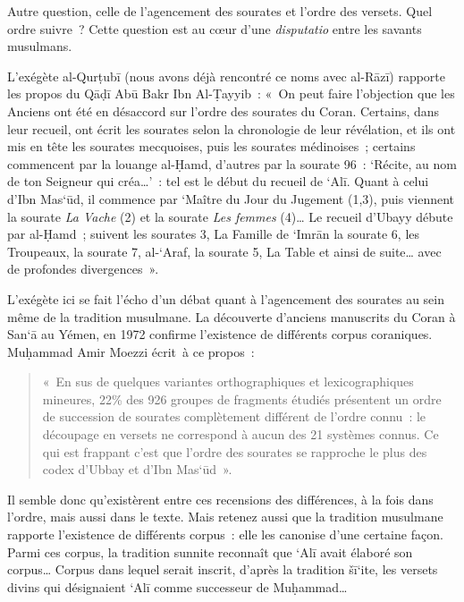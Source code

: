 
Autre question, celle de l'agencement des sourates et l'ordre des
versets. Quel ordre suivre~? Cette question est au cœur d'une
\emph{disputatio} entre les savants musulmans.

L'exégète al-Qurṭubī (nous avons déjà rencontré ce noms avec al-Rāzī)
rapporte les propos du Qāḍī Abū Bakr Ibn Al-Ṭayyib~: «~On peut faire
l'objection que les Anciens ont été en désaccord sur l'ordre des
sourates du Coran. Certains, dans leur recueil, ont écrit les sourates
selon la chronologie de leur révélation, et ils ont mis en tête les
sourates mecquoises, puis les sourates médinoises~; certains commencent
par la louange al-Ḥamd, d'autres par la sourate 96~: `Récite, au nom de
ton Seigneur qui créa\ldots'~: tel est le début du recueil de `Alī.
Quant à celui d'Ibn Mas`ūd, il commence par `Maître du Jour du Jugement
(1,3), puis viennent la sourate \emph{La Vache} (2) et la sourate
\emph{Les femmes} (4)\ldots{} Le recueil d'Ubayy débute par al-Ḥamd~;
suivent les sourates 3, La Famille de `Imrān la sourate 6, les
Troupeaux, la sourate 7, al-`Araf, la sourate 5, La Table et ainsi de
suite\ldots{} avec de profondes divergences~».

L'exégète ici se fait l'écho d'un débat quant à l'agencement des
sourates au sein même de la tradition musulmane. La découverte d'anciens
manuscrits du Coran à San`ā au Yémen, en 1972 confirme l'existence de
différents corpus coraniques. Muḥammad Amir Moezzi écrit~à ce propos~:
\begin{quote}
    «~En sus de quelques variantes orthographiques et lexicographiques
mineures, 22\% des 926 groupes de fragments étudiés présentent un ordre
de succession de sourates complètement différent de l'ordre connu~: le
découpage en versets ne correspond à aucun des 21 systèmes connus. Ce
qui est frappant c'est que l'ordre des sourates se rapproche le plus des
codex d'Ubbay et d'Ibn Mas`ūd~».
\end{quote}


Il semble donc qu'existèrent entre ces recensions des différences, à la
fois dans l'ordre, mais aussi dans le texte. Mais retenez aussi que la
tradition musulmane rapporte l'existence de différents corpus~: elle les
canonise d'une certaine façon. Parmi ces corpus, la tradition sunnite
reconnaît que `Alī avait élaboré son corpus\ldots{} Corpus dans lequel
serait inscrit, d'après la tradition šī`ite, les versets divins qui
désignaient `Alī comme successeur de Muḥammad\ldots{}

